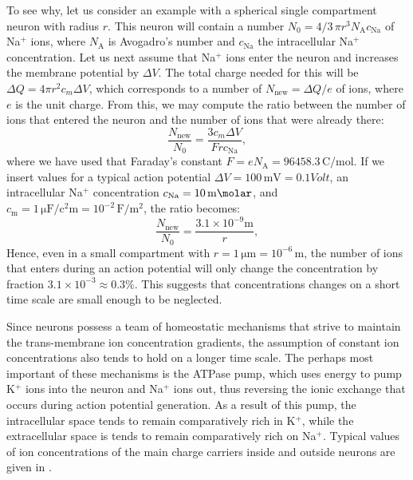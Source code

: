 To see why, let us consider an example with a spherical single compartment neuron with radius $r$. This neuron will contain a number $N_0 = 4/3 \,\pi r^3 N_\text{A} c_\text{Na}$ of Na$^{+}$ ions, where $N_\text{A}$ is Avogadro's number and $c_\text{Na}$ the intracellular Na$^{+}$ concentration. Let us next assume that Na$^+$ ions enter the neuron and increases the membrane potential by $\Delta V$. The total charge needed for this will be $\Delta Q = 4 \pi r^2 c_m \Delta V$, which corresponds to a number of $N_\text{new} = \Delta Q/e$ of ions, where $e$ is the unit charge. From this, we may compute the ratio between the number of ions that entered the neuron and the number of ions that were already there:
\begin{equation}
\frac{N_\text{new}}{N_0} = \frac{3 c_m \Delta V}{F r c_\text{Na}}, 
\label{eq:Neuron:NaNaNa}
\end{equation}
where we have used that Faraday's constant $F = eN_\text{A} = 96458.3 \, \si{\coulomb\per\mol}$. If we insert values for a typical action potential $\Delta V = 100 \,\si{\milli\volt} = 0.1 \si{Volt}$, an intracellular Na$^+$ concentration $c_\text{Na} = 10 \, \si{\milli\molar}$, and $c_\text{m} = 1 \, \si{\micro\farad\per\square\centi\metre} = 10^{-2}\, \si{\farad\per\square\metre}$, the ratio becomes:
\begin{equation}
\frac{N_\text{new}}{N_0} = \frac{3.1 \times 10^{-9} \si{\metre}}{r}, 
\label{eq:Neuron:NaNaNaNa}
\end{equation}
Hence, even in a small compartment with $r=1\,\si{\micro\metre} = 10^{-6}\,\si{\metre}$, the number of ions that enters during an action potential will only change the concentration by fraction $3.1 \times 10^{-3} \approx 0.3 \%$. This suggests that concentrations changes on a short time scale are small enough to be neglected. 

Since neurons possess a team of homeostatic mechanisms that strive to maintain the trans-membrane ion concentration gradients, the assumption of constant ion concentrations also tends to hold on a longer time scale. The perhaps most important of these mechanisms is the ATPase pump, which uses energy to pump K$^+$ ions into the neuron and Na$^+$ ions out, thus reversing the ionic exchange that occurs during action potential generation. As a result of this pump, the intracellular space tends to remain comparatively rich in K$^+$, while the extracellular space is tends to remain comparatively rich on Na$^+$. Typical values of ion concentrations of the main charge carriers inside and outside neurons are given in . 

